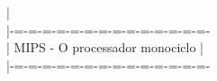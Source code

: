\documentclass{article}
\begin{document}
|\\
|-=-=-=-=-=-=-=-=-=-=-=-=-=-=-\\
|  MIPS - O processador monociclo  |\\
|-=-=-=-=-=-=-=-=-=-=-=-=-=-=-\\
\end{document}
